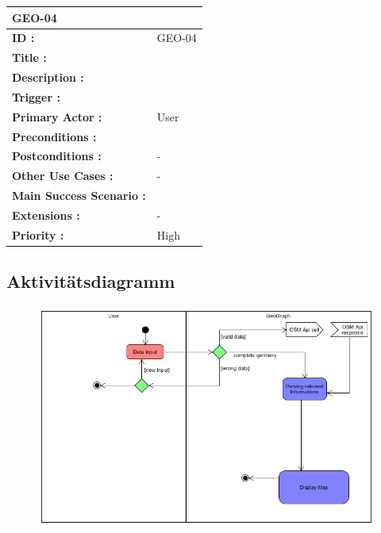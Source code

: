 	\begin{table}[H]
		\begin{tabular}{|p{8cm}|p{8cm}|}
			\hline
			\textbf{GEO-04 } \\ 
			\hline
			\textbf{ID :}\centering & GEO-04  \\ \hline 
			\textbf{Title :}\centering & \\ \hline 
			\textbf{Description :}\centering & \\ \hline 
			\textbf{Trigger :}\centering & \\ \hline 
			\textbf{Primary Actor :} \centering & User \\ \hline 
			\textbf{Preconditions :}\centering & \\ \hline 
			\textbf{Postconditions :}\centering & - \\ \hline
			\textbf{Other Use Cases :}\centering & - \\ \hline  
			\textbf{Main Success Scenario :}\centering & \\ \hline  
			\textbf{Extensions :}\centering & - \\ \hline  
			\textbf{Priority :}\centering & High \\ \hline  
		\end{tabular}
	\end{table}
	
	\subsection{Aktivitätsdiagramm}
		\begin{figure}[H]
			\centering
			\includegraphics[width=0.7\linewidth]{images/Ablauf}
			\caption{}
			\label{fig:Akitiviti}
		\end{figure}
